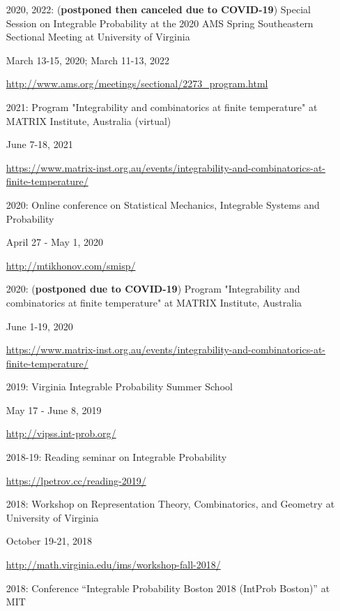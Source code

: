 \documentclass[letterpaper,11pt]{article}
\begin{document}
\begin{itemize}
	\item [2020, 2022:]
	(\textbf{postponed then canceled due to COVID-19})
		Special Session on Integrable Probability
		at the 2020 AMS Spring Southeastern Sectional Meeting at 
		University of Virginia
		
		March 13-15, 2020; March 11-13, 2022

		\url{http://www.ams.org/meetings/sectional/2273_program.html}
		
	\item [2021:]
		Program "Integrability and combinatorics at finite temperature"
		at MATRIX Institute, Australia
		(virtual)

		June 7-18, 2021

		\url{https://www.matrix-inst.org.au/events/integrability-and-combinatorics-at-finite-temperature/}
	\item [2020:]
		Online conference on Statistical Mechanics, Integrable Systems and Probability
		
		April 27 - May 1, 2020

		\url{http://mtikhonov.com/smisp/}
	\item [2020:]
	(\textbf{postponed due to COVID-19})
		Program "Integrability and combinatorics at finite temperature"
		at MATRIX Institute,
		Australia

		June 1-19, 2020

		\url{https://www.matrix-inst.org.au/events/integrability-and-combinatorics-at-finite-temperature/}

	\item [2019:]
		Virginia Integrable Probability Summer School
		
		May 17 - June 8, 2019

		\url{http://vipss.int-prob.org/}

	\item[2018-19:]
	      Reading seminar on Integrable Probability

	      \url{https://lpetrov.cc/reading-2019/}
		
	\item [2018:]
		Workshop on Representation Theory, Combinatorics, and Geometry
		at University of
		Virginia
		
		October 19-21, 2018
	
		\url{http://math.virginia.edu/ims/workshop-fall-2018/}

	\item [2018:]
		Conference 
		``Integrable Probability Boston 2018 (IntProb Boston)''
		at MIT


\end{itemize}
\end{document}
